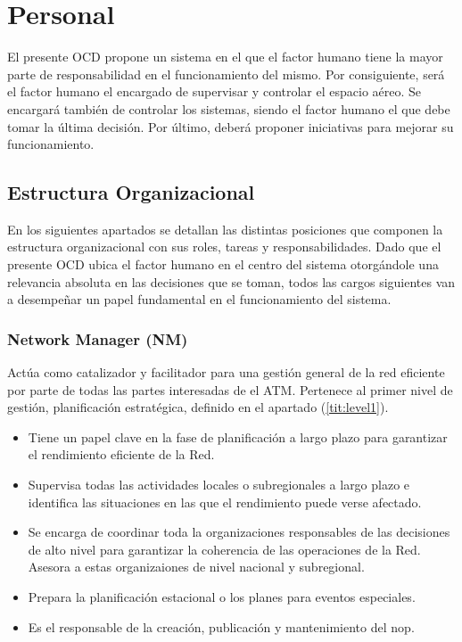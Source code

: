 \section{Personal}

El presente OCD propone un sistema en el que el factor humano tiene la mayor parte de responsabilidad en el funcionamiento del mismo. Por consiguiente, será el factor humano el encargado de supervisar y controlar el espacio aéreo. Se encargará también de controlar los sistemas, siendo el factor humano el que debe tomar la última decisión. Por último, deberá proponer iniciativas para mejorar su funcionamiento.

\subsection{Estructura Organizacional}

En los siguientes apartados se detallan las distintas posiciones que componen la estructura organizacional con sus roles, tareas y responsabilidades. Dado que el presente OCD ubica el factor humano en el centro del sistema otorgándole una relevancia absoluta en las decisiones que se toman, todos las cargos siguientes van a desempeñar un papel fundamental en el funcionamiento del sistema.

\subsubsection{Network Manager (NM)}

Actúa como catalizador y facilitador para una gestión general de la red eficiente por parte de todas las partes interesadas de el ATM. Pertenece al primer nivel de gestión, planificación estratégica, definido en el apartado (\ref{tit:level1}).
    
\begin{itemize}
    \item Tiene un papel clave en la fase de planificación a largo plazo para garantizar el rendimiento eficiente de la Red.
    
    \item Supervisa todas las actividades locales o subregionales a largo plazo e identifica las situaciones en las que el rendimiento puede verse afectado.
    
    \item Se encarga de coordinar toda la organizaciones responsables de las decisiones de alto nivel para garantizar la coherencia de las operaciones de la Red. Asesora a estas organizaiones de nivel nacional y subregional.
    
    \item Prepara la planificación estacional o los planes para eventos especiales.
    
    \item Es el responsable de la creación, publicación y mantenimiento del \acrfull{nop}.
\end{itemize}

